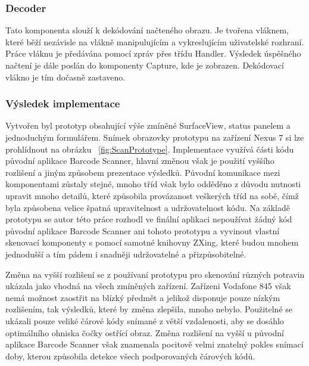 \documentclass[thesis=B,czech]{FITthesis}[2013/10/20]
\begin{document}
\subsubsection{Decoder}

Tato komponenta slouží k dekódování načteného obrazu. Je tvořena vláknem, které běží nezávisle na vlákně manipulujícím a vykreslujícím uživatelské rozhraní. Práce vláknu je předávána pomocí zpráv přes třídu Handler. Výsledek úspěšného načtení je dále poslán do komponenty Capture, kde je zobrazen. Dekódovací vlákno je tím dočasně zastaveno.

\subsubsection{Výsledek implementace}

Vytvořen byl prototyp obsahující výše zmíněné SurfaceView, status panelem a jednoduchým formulářem. Snímek obrazovky prototypu na zařízení Nexus 7 si lze prohlídnout na obrázku  ~\ref{fig:ScanPrototype}. Implementace využívá části kódu původní aplikace Barcode Scanner, hlavní změnou však je použití vyššího rozlišení a jiným způsobem prezentace výsledků. Původní komunikace mezi komponentami zůstaly stejné, mnoho tříd však bylo odděděno z důvodu nutnosti upravit mnoho detailů, které způsobila provázanost veškerých tříd na sobě, čímž byla způsobena velice špatná upravitelnost a udržovatelnost kódu. Na základě prototypu se autor této práce rozhodl ve finální aplikaci nepoužívat žádný kód původní aplikace Barcode Scanner ani tohoto prototypu a vyvinout vlastní skenovací komponenty s pomocí samotné knihovny ZXing, které budou mnohem jednodušší a tím pádem i snadněji udržovatelné a přizpůsobitelné.

Změna na vyšší rozlišení se z používaní prototypu pro skenování různých potravin ukázala jako vhodná na všech zmíněných zařízení. Zařízeni Vodafone 845 však nemá možnost zaostřit na blízký předmět a jelikož disponuje pouze nízkým rozlišením, tak výsledků, které by změna zlepšila, mnoho nebylo. Použitelné se ukázali pouze veliké čárové kódy snímané z větší vzdalenosti, aby se dosáhlo optimálního ohniska čočky ostřící obraz. Změna rozlišení na vyšší u původní aplikace Barcode Scanner však znamenala pocitově velmi znatelný pokles snímací doby, kterou způsobila detekce všech podporovaných čárových kódů.
\end{document}
